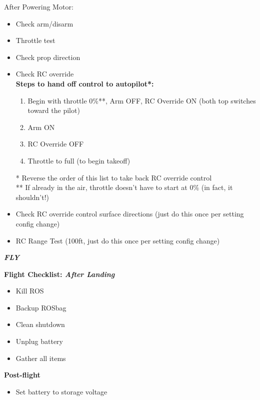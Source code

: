 \documentclass[]{auvsi_doc}
\begin{document}
After Powering Motor:

\begin{itemize}
	\item Check arm/disarm
	\item Throttle test
	\item Check prop direction
	\item Check RC override \\
				\textbf{Steps to hand off control to autopilot*:}
	\begin{enumerate}
		\item Begin with throttle 0\%**, Arm OFF, RC Override ON (both top switches toward the pilot)
		\item Arm ON
		\item RC Override OFF
		\item Throttle to full (to begin takeoff)
	\end{enumerate}
	* Reverse the order of this list to take back RC override control \\
	** If already in the air, throttle doesn't have to start at 0\% (in fact, it shouldn't!)
	\item Check RC override control surface directions (just do this once per setting config change)
	\item RC Range Test (100ft, just do this once per setting config change)
\end{itemize}

\hrulefill

\textit{\textbf{FLY}}

\hrulefill

\textbf{Flight Checklist: \textit{After Landing}}
\begin{itemize}
	\item Kill ROS
	\item Backup ROSbag
	\item Clean shutdown
	\item Unplug battery
	\item Gather all items
\end{itemize}

\hrulefill

\textbf{Post-flight}
\begin{itemize}
	\item Set battery to storage voltage
\end{itemize}
\end{document}
